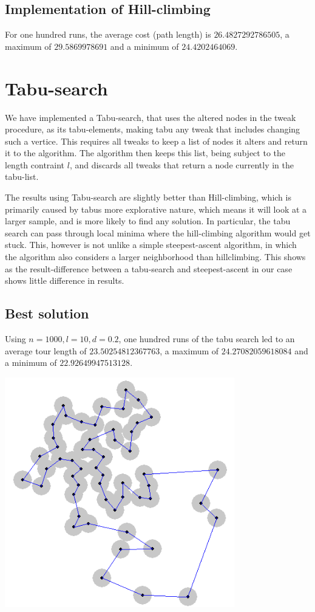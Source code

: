 \documentclass{article}
\begin{document}
\subsection{Implementation of Hill-climbing}

For one hundred runs, the average cost (path length) is
$26.4827292786505$, a maximum of $29.5869978691$ and a minimum of $24.4202464069$.

\section{Tabu-search}
We have implemented a Tabu-search, that uses the altered nodes in the tweak procedure,
as its tabu-elements, making tabu any tweak that includes changing such a vertice.
This requires all tweaks to keep a list of nodes it alters and return it to the algorithm.
The algorithm then keeps this list, being subject to the length contraint $l$, and discards all tweaks that return
a node currently in the tabu-list.

The results using Tabu-search are slightly better than Hill-climbing,
which is primarily caused by tabus more explorative nature, which
means it will look at a larger sample, and is more likely to find any
solution.  In particular, the tabu search can pass through local
minima where the hill-climbing algorithm would get stuck.  This,
however is not unlike a simple steepest-ascent algorithm, in which the
algorithm also considers a larger neighborhood than hillclimbing. This
shows as the result-difference between a tabu-search and
steepest-ascent in our case shows little difference in results.

\subsection{Best solution}

Using $n=1000,l=10,d=0.2$, one hundred runs of the tabu search led to
an average tour length of $23.50254812367763$, a maximum of
$24.27082059618084$ and a minimum of $22.92649947513128$.

\includegraphics[width=100mm]{solution-2316.png}
\end{document}
